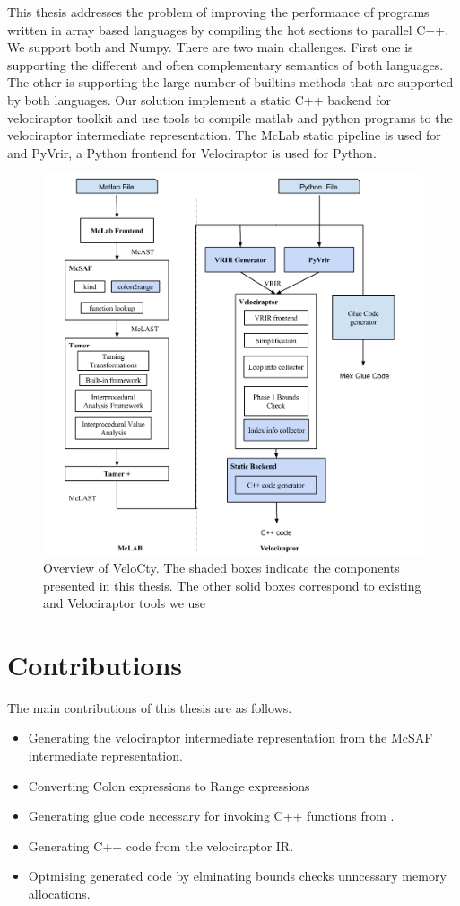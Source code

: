 This thesis addresses the problem of improving the performance of programs written in array based languages by compiling the hot sections to parallel C++. We support both \matlab and Numpy. There are two main challenges. First one is supporting the different and often complementary semantics of both languages. The other is supporting the large number of builtins methods that are supported by both languages.
Our solution implement a static C++ backend for velociraptor toolkit and use tools to compile matlab and python programs to the velociraptor intermediate representation. The McLab static pipeline is used for \matlab and PyVrir, a Python frontend for Velociraptor is used for Python. 
\begin{figure}[htbp]
\begin{center}
\includegraphics[scale=0.5]{Figures/Overview_thesis.png}
\caption[Overview of the VeloCty]{Overview
of VeloCty.  The shaded boxes indicate the components
presented in this thesis.  The other solid boxes correspond to
existing \mclab and Velociraptor tools we use}\label{Fig:Overview}
\end{center}
\end{figure}
\section{Contributions}
The main contributions of this thesis are as follows.
\begin{itemize}
\item Generating the velociraptor intermediate representation from the McSAF intermediate representation. 
\item Converting Colon expressions to Range expressions
\item Generating glue code necessary for invoking C++ functions from \matlab.
\item Generating C++ code from the velociraptor IR.
\item Optmising generated code by elminating bounds checks unncessary memory allocations. 
\end{itemize}
